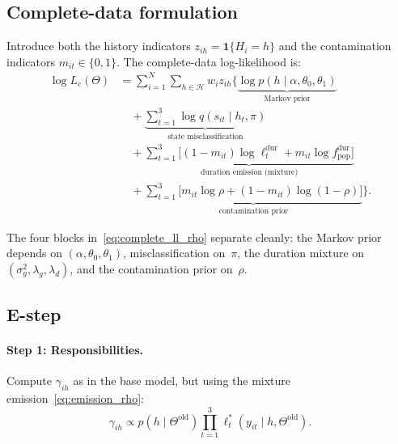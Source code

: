 \documentclass[12pt]{article}
\begin{document}
\subsection{Complete-data formulation}

Introduce both the history indicators \(z_{ih} = \mathbf{1}\{H_i = h\}\) and the contamination indicators \(m_{it} \in \{0,1\}\). The complete-data log-likelihood is:
\begin{align}
\log L_c(\Theta) &= \sum_{i=1}^N \sum_{h \in \mathcal{H}} w_i z_{ih} \bigg\{
\underbrace{\log p(h \mid \alpha, \theta_0, \theta_1)}_{\text{Markov prior}} \nonumber\\
&\quad + \underbrace{\sum_{t=1}^3 \log q(s_{it} \mid h_t, \pi)}_{\text{state misclassification}} \nonumber\\
&\quad + \underbrace{\sum_{t=1}^3 \Big[(1 - m_{it}) \log \ell^{\mathrm{dur}}_t + m_{it} \log f^{\mathrm{dur}}_{\mathrm{pop}}\Big]}_{\text{duration emission (mixture)}} \nonumber\\
&\quad + \underbrace{\sum_{t=1}^3 \Big[m_{it} \log \rho + (1 - m_{it}) \log(1 - \rho)\Big]}_{\text{contamination prior}}
\bigg\}.
\label{eq:complete_ll_rho}
\end{align}

The four blocks in~\eqref{eq:complete_ll_rho} separate cleanly: the Markov prior depends on \((\alpha, \theta_0, \theta_1)\), misclassification on~\(\pi\), the duration mixture on \((\sigma^2_g, \lambda_g, \lambda_d)\), and the contamination prior on~\(\rho\).

\subsection{E-step}

\paragraph{Step 1: Responsibilities.}
Compute \(\gamma_{ih}\) as in the base model, but using the mixture emission~\eqref{eq:emission_rho}:
\begin{equation}
\gamma_{ih} \propto p(h \mid \Theta^{\mathrm{old}}) \prod_{t=1}^3 \ell^*_t(y_{it} \mid h, \Theta^{\mathrm{old}}).
\label{eq:resp_rho}
\end{equation}
\end{document}
